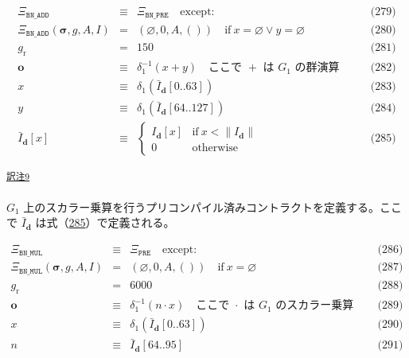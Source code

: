 \documentclass[
]{ltjsarticle}
\begin{document}
\[\begin{aligned}
\Xi_{\mathtt{BN\_ADD}}&\equiv&\Xi_{\mathtt{BN\_PRE}}\quad\text{except:} & \qquad \text{(279)} \\
\Xi_{\mathtt{BN\_ADD}}(\boldsymbol\sigma,g,A,I)&=&\left(\varnothing,0,A,()\right)\quad\text{if}\ x=\varnothing\vee y=\varnothing & \qquad \text{(280)} \\
g_{\mathrm{r}} &=& 150 & \qquad \text{(281)} \\
\mathbf{o}&\equiv&\delta_1^{-1}(x+y)\quad\text{ここで }+\text{ は }G_1\text{ の群演算} & \qquad \text{(282)} \\
x&\equiv&\delta_1\left(\bar I_{\mathbf{d}}[0..63]\right) & \qquad \text{(283)} \\
y&\equiv&\delta_1\left(\bar I_{\mathbf{d}}[64..127]\right) & \qquad \text{(284)} \\
\bar I_{\mathbf{d}}[x]&\equiv&\begin{cases}
I_{\mathbf{d}}[x]&\text{if}\ x < \lVert I_{\mathbf{d}} \rVert\\
0&\text{otherwise}
\end{cases} & \qquad \text{(285)}
\end{aligned}\]

\protect\hypertarget{tnref-9}{}{}\textsuperscript{\protect\hyperlink{tn-9}{訳注9}}

\(G_1\)
上のスカラー乗算を行うプリコンパイル済みコントラクトを定義する。ここで
\(\bar I_{\mathbf{d}}\)
は式（\protect\hyperlink{eq:complemented_input}{285}）で定義される。

\protect\hypertarget{eq-286}{}{}\protect\hypertarget{eq-287}{}{}\protect\hypertarget{eq-288}{}{}\protect\hypertarget{eq-289}{}{}\protect\hypertarget{eq-290}{}{}\protect\hypertarget{eq-291}{}{}

\[\begin{aligned}
\Xi_{\mathtt{BN\_MUL}}&\equiv&\Xi_{\mathtt{PRE}}\quad\text{except:} & \qquad \text{(286)} \\
\Xi_{\mathtt{BN\_MUL}}(\boldsymbol\sigma,g,A,I)&=&\left(\varnothing,0,A,()\right)\quad\text{if}\ x=\varnothing & \qquad \text{(287)} \\
g_{\mathrm{r}} &=& 6000 & \qquad \text{(288)} \\
\mathbf{o}&\equiv&\delta_1^{-1}(n\cdot x)\quad\text{ここで }\cdot\text{ は }G_1\text{ のスカラー乗算} & \qquad \text{(289)} \\
x&\equiv&\delta_1\left(\bar I_{\mathbf{d}}[0..63]\right) & \qquad \text{(290)} \\
n&\equiv&\bar I_{\mathbf{d}}[64..95] & \qquad \text{(291)}
\end{aligned}\]
\end{document}
